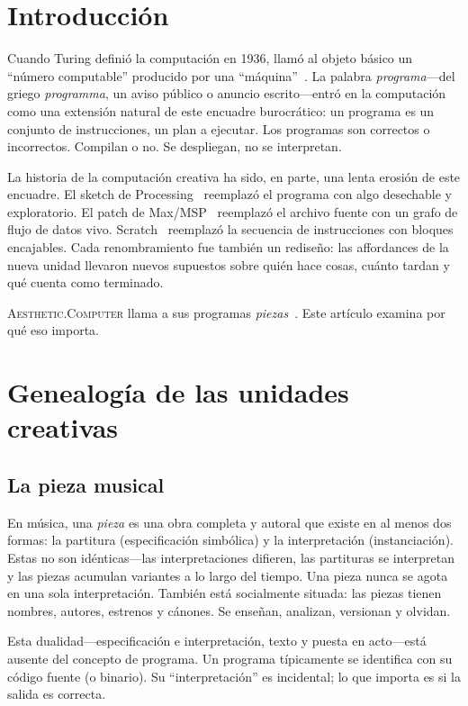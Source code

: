 \documentclass[10pt,letterpaper,twocolumn]{article}
\newcommand{\ac}{\textsc{Aesthetic.Computer}}
\begin{document}
\section{Introducción}

Cuando Turing definió la computación en 1936, llamó al objeto básico un ``número computable'' producido por una ``máquina''~\citep{turing1936computable}. La palabra \emph{programa}---del griego \emph{programma}, un aviso público o anuncio escrito---entró en la computación como una extensión natural de este encuadre burocrático: un programa es un conjunto de instrucciones, un plan a ejecutar. Los programas son correctos o incorrectos. Compilan o no. Se despliegan, no se interpretan.

La historia de la computación creativa ha sido, en parte, una lenta erosión de este encuadre. El sketch de Processing~\citep{reas2007processing} reemplazó el programa con algo desechable y exploratorio. El patch de Max/MSP~\citep{puckette1988patcher} reemplazó el archivo fuente con un grafo de flujo de datos vivo. Scratch~\citep{resnick2009scratch} reemplazó la secuencia de instrucciones con bloques encajables. Cada renombramiento fue también un rediseño: las affordances de la nueva unidad llevaron nuevos supuestos sobre quién hace cosas, cuánto tardan y qué cuenta como terminado.

\ac{} llama a sus programas \emph{piezas}~\citep{scudder2026ac}. Este artículo examina por qué eso importa.

\section{Genealogía de las unidades creativas}

\subsection{La pieza musical}

En música, una \emph{pieza} es una obra completa y autoral que existe en al menos dos formas: la partitura (especificación simbólica) y la interpretación (instanciación). Estas no son idénticas---las interpretaciones difieren, las partituras se interpretan y las piezas acumulan variantes a lo largo del tiempo. Una pieza nunca se agota en una sola interpretación. También está socialmente situada: las piezas tienen nombres, autores, estrenos y cánones. Se enseñan, analizan, versionan y olvidan.

Esta dualidad---especificación e interpretación, texto y puesta en acto---está ausente del concepto de programa. Un programa típicamente se identifica con su código fuente (o binario). Su ``interpretación'' es incidental; lo que importa es si la salida es correcta.
\end{document}
